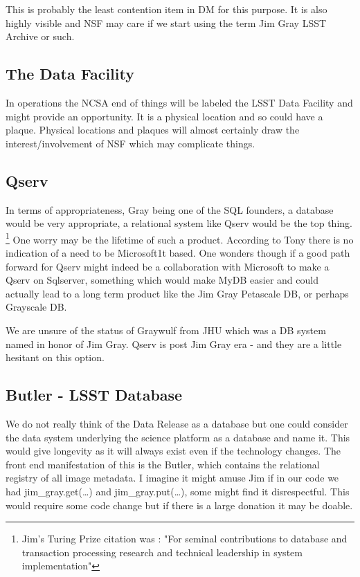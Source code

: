 This is probably the least contention item in DM for this purpose. It is also highly visible and NSF may care if we start using the term Jim Gray LSST Archive or such.

\subsection {The Data Facility}
In operations the NCSA end of things will be labeled the LSST Data Facility  and might provide an opportunity. It is a physical location and so could have a plaque. Physical locations and plaques will almost certainly draw the interest/involvement of NSF which may complicate things.

\subsection{Qserv } \label{sec:qserv}
In terms of appropriateness, Gray being one of the SQL founders, a database would be very appropriate, a relational
system like Qserv would be the top thing. \footnote{Jim's Turing Prize citation was : "For seminal contributions to database and transaction processing research and technical leadership in system implementation"} One worry may be the lifetime of such a product. According to Tony there is no
indication of a need to be Microsoft1t based. One wonders though if a good path forward for Qserv might indeed be a collaboration with Microsoft to make a Qserv on Sqlserver, something which would make MyDB easier and could actually lead to a long term product like the Jim Gray Petascale DB, or perhaps Grayscale DB.

We are unsure of the status of Graywulf from JHU which was a DB system named in honor of Jim Gray.
Qserv is post Jim Gray era -  and they are a little hesitant on this option.

\subsection{Butler - LSST Database} \label{sec:butler}
We do not really think of the Data Release as a database but one could consider the data system underlying the science platform as a database and name it. This would give longevity as it will always exist even if the technology changes.
The front end manifestation of this is the Butler, which contains the relational registry of all image metadata.
I imagine it might amuse Jim if in our code we had jim\_gray.get(\ldots) and jim\_gray.put(\ldots), some might find it disrespectful.
 This would require some code change but if there is a large donation it may be doable.

